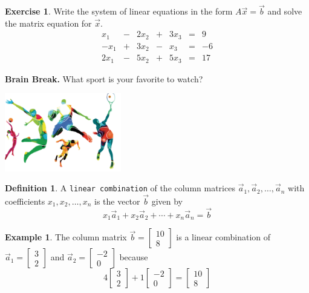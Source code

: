 \documentclass[handout]{beamer}
\newcommand{\veca}{\vec{a}}
\newcommand{\vecb}{\vec{b}}
\newcommand{\vecx}{\vec{x}}
\newcommand{\fn}{\insertframenumber}
\theoremstyle{definition}
\newtheorem{exercise}{Exercise}
\newtheorem*{defn}{Definition}
\newtheorem*{exa}{Example}
\renewcommand{\emph}[1]{{\color{blue}\texttt{#1}}}
\begin{document}
\begin{frame}{\fn}
	\begin{exercise}
		Write the system of linear equations in the form $A\vecx=\vecb$ and solve the matrix equation for $\vecx$.
		\[
		\begin{array}{rcrcrcr}
			x_1&-&2x_2&+&3x_3&=&9\\
			-x_1&+&3x_2&-&x_3&=&-6\\
			2x_1&-&5x_2&+&5x_3&=&17
		\end{array}
		\]
	\end{exercise}
\end{frame}
\begin{frame}{\fn}
	\begin{block}{\textbf{Brain Break.}}
		What sport is your favorite to watch?
		\begin{center}
			\includegraphics[width=2in]{images/sports}
		\end{center}
	\end{block}
\end{frame}
\begin{frame}{\fn}
	\begin{defn}
		A \emph{linear combination} of the column matrices $\veca_1,\veca_2,\dots,\veca_n$ with coefficients $x_1,x_2,\dots,x_n$ is the vector $\vecb$ given by 
		\[x_1\veca_1+x_2\veca_2+\cdots+x_n\veca_n=\vecb\]
	\end{defn}
	\begin{exa}
		The column matrix $\vecb=\begin{bmatrix}10\\8\end{bmatrix}$ is a linear combination of $\veca_1=\begin{bmatrix}3\\2\end{bmatrix}$ and $\veca_2=\begin{bmatrix}-2\\0\end{bmatrix}$ because
		\[
		4\begin{bmatrix}3\\2\end{bmatrix}+
		1\begin{bmatrix}-2\\0\end{bmatrix}
		=\begin{bmatrix}
		10\\8
		\end{bmatrix}
		\]
	\end{exa}
\end{frame}
\end{document}
